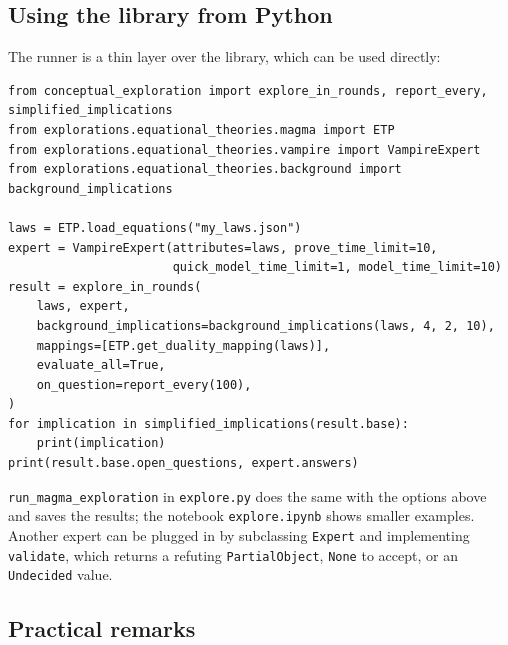 \documentclass[11pt,a4paper]{article}
\theoremstyle{definition}
\theoremstyle{remark}
\newcommand{\code}[1]{\texttt{#1}}
\begin{document}
\subsection{Using the library from Python}

The runner is a thin layer over the library, which can be used directly:
\begin{Verbatim}
from conceptual_exploration import explore_in_rounds, report_every, simplified_implications
from explorations.equational_theories.magma import ETP
from explorations.equational_theories.vampire import VampireExpert
from explorations.equational_theories.background import background_implications

laws = ETP.load_equations("my_laws.json")
expert = VampireExpert(attributes=laws, prove_time_limit=10,
                       quick_model_time_limit=1, model_time_limit=10)
result = explore_in_rounds(
    laws, expert,
    background_implications=background_implications(laws, 4, 2, 10),
    mappings=[ETP.get_duality_mapping(laws)],
    evaluate_all=True,
    on_question=report_every(100),
)
for implication in simplified_implications(result.base):
    print(implication)
print(result.base.open_questions, expert.answers)
\end{Verbatim}
\code{run\_magma\_exploration} in \code{explore.py} does the same with the options above and saves the results; the notebook \code{explore.ipynb} shows smaller examples. Another expert can be plugged in by subclassing \code{Expert} and implementing \code{validate}, which returns a refuting \code{PartialObject}, \code{None} to accept, or an \code{Undecided} value.

\subsection{Practical remarks}
\end{document}
